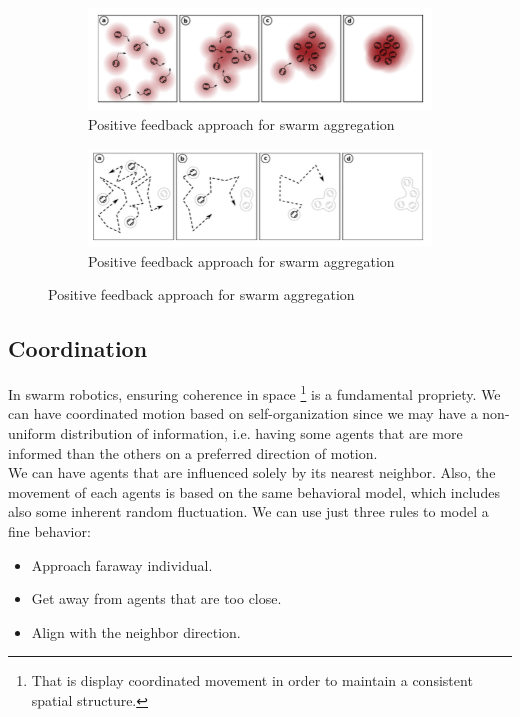 \documentclass[10pt,a4paper]{article}
\begin{document}
\begin{figure}[H]
\centering
\begin{subfigure}
 \centering
\includegraphics[scale=0.5]{images/positivie_feedback.png}
\caption{Positive feedback approach for swarm aggregation}
\label{fig:positive_feed}
\end{subfigure}%

\begin{subfigure}
\centering
\includegraphics[scale=0.5]{images/social_cues.png}
\caption{Positive feedback approach for swarm aggregation}
\label{fig:social_cues}
\end{subfigure}%

\end{figure}

\subsection{Coordination}
In swarm robotics, ensuring coherence in space \footnote{That is display coordinated movement in order to maintain a consistent spatial structure.} is a fundamental propriety. We can have coordinated motion based on self-organization since we may have a non-uniform distribution of information, i.e.  having some agents that are more informed than the others on a preferred direction of motion.\\
We can have agents that are influenced solely by its nearest neighbor. Also, the movement of each agents is based on the same behavioral model, which includes also some inherent random fluctuation. We can use just three rules to model a fine behavior:
\begin{itemize}
\item Approach faraway individual.
\item Get away from agents that are too close.
\item Align with the neighbor direction.
\end{itemize}
\end{document}
